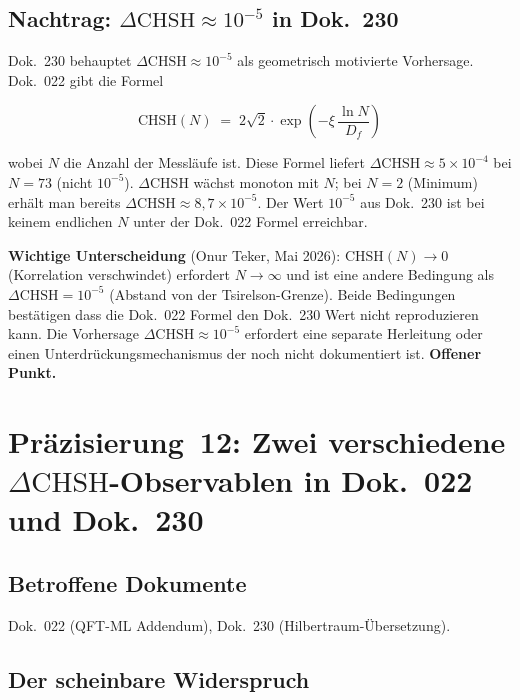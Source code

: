 \subsection*{Nachtrag: $\Delta\text{CHSH} \approx 10^{-5}$ in Dok.~230}

Dok.~230 behauptet $\Delta\text{CHSH} \approx 10^{-5}$ als geometrisch
motivierte Vorhersage. Dok.~022 gibt die Formel

\begin{equation}
  \text{CHSH}(N) \;=\; 2\sqrt{2}\cdot\exp\!\left(-\xi\,\frac{\ln N}{D_f}\right)
  \tag{190.20}
\end{equation}

wobei $N$ die Anzahl der Messläufe ist. Diese Formel liefert
$\Delta\text{CHSH} \approx 5\times10^{-4}$ bei $N=73$ (nicht $10^{-5}$).
$\Delta\text{CHSH}$ wächst monoton mit $N$; bei $N=2$ (Minimum) erhält
man bereits $\Delta\text{CHSH} \approx 8{,}7\times10^{-5}$.
Der Wert $10^{-5}$ aus Dok.~230 ist bei keinem endlichen $N$ unter der
Dok.~022 Formel erreichbar.

\textbf{Wichtige Unterscheidung} (Onur Teker, Mai 2026):
$\text{CHSH}(N)\to 0$ (Korrelation verschwindet) erfordert $N\to\infty$
und ist eine andere Bedingung als $\Delta\text{CHSH}=10^{-5}$
(Abstand von der Tsirelson-Grenze). Beide Bedingungen bestätigen dass
die Dok.~022 Formel den Dok.~230 Wert nicht reproduzieren kann.
Die Vorhersage $\Delta\text{CHSH}\approx 10^{-5}$ erfordert eine
separate Herleitung oder einen Unterdrückungsmechanismus der noch nicht
dokumentiert ist. \textbf{Offener Punkt.}


\section{\texorpdfstring{Präzisierung~12: Zwei verschiedene $\Delta\text{CHSH}$-Observablen in Dok.~022 und Dok.~230}{Präzisierung 12: Zwei verschiedene CHSH-Observablen}}

\subsection*{Betroffene Dokumente}

Dok.~022 (QFT-ML Addendum), Dok.~230 (Hilbertraum-Übersetzung).

\subsection*{Der scheinbare Widerspruch}

